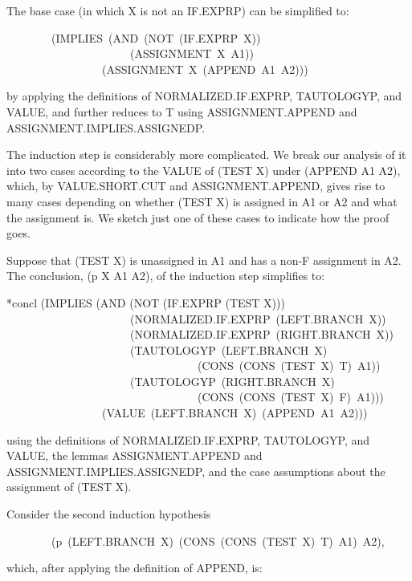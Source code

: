 \documentclass[10pt]{book}
\newenvironment{pubasis}{\begin{flushleft}}{\end{flushleft}}
\begin{document}
The base case (in which X is not an IF.EXPRP) can be simplified to:
\begin{pubasis}
~~~~~~~~(IMPLIES~(AND~(NOT~(IF.EXPRP~X))\\
~~~~~~~~~~~~~~~~~~~~~~(ASSIGNMENT~X~A1))\\
~~~~~~~~~~~~~~~~~(ASSIGNMENT~X~(APPEND~A1~A2)))\\
\end{pubasis}
by applying the definitions of NORMALIZED.IF.EXPRP, TAUTOLOGYP, and VALUE,
and further reduces to T using ASSIGNMENT.APPEND and ASSIGNMENT.IMPLIES.ASSIGNEDP.

The induction step is considerably more complicated.  We break our analysis
of it into two cases according to the VALUE of (TEST X) under (APPEND A1 A2),
which, by VALUE.SHORT.CUT and ASSIGNMENT.APPEND, gives rise to
many cases depending on whether (TEST X) is assigned in A1 or A2 and what
the assignment is.  We sketch just one of these cases to indicate
how the proof goes.

Suppose that (TEST X) is unassigned in A1 and has a non-F assignment
in A2.  The conclusion, (p X A1 A2), of the induction step
simplifies to:

\begin{pubasis}
*concl	(IMPLIES (AND (NOT (IF.EXPRP (TEST X)))\\
~~~~~~~~~~~~~~~~~~~~~~(NORMALIZED.IF.EXPRP~(LEFT.BRANCH~X))\\
~~~~~~~~~~~~~~~~~~~~~~(NORMALIZED.IF.EXPRP~(RIGHT.BRANCH~X))\\
~~~~~~~~~~~~~~~~~~~~~~(TAUTOLOGYP~(LEFT.BRANCH~X)\\
~~~~~~~~~~~~~~~~~~~~~~~~~~~~~~~~~~(CONS~(CONS~(TEST~X)~T)~A1))\\
~~~~~~~~~~~~~~~~~~~~~~(TAUTOLOGYP~(RIGHT.BRANCH~X)\\
~~~~~~~~~~~~~~~~~~~~~~~~~~~~~~~~~~(CONS~(CONS~(TEST~X)~F)~A1)))\\
~~~~~~~~~~~~~~~~~(VALUE~(LEFT.BRANCH~X)~(APPEND~A1~A2)))\\
\end{pubasis}
using the definitions of NORMALIZED.IF.EXPRP, TAUTOLOGYP, and VALUE,
the lemmas ASSIGNMENT.APPEND and ASSIGNMENT.IMPLIES.ASSIGNEDP,
and the case assumptions about the assignment of (TEST X).

Consider the second induction hypothesis
\begin{pubasis}
~~~~~~~~(p~(LEFT.BRANCH~X)~(CONS~(CONS~(TEST~X)~T)~A1)~A2),\\
\end{pubasis}
which, after applying the definition of APPEND, is:
\end{document}
